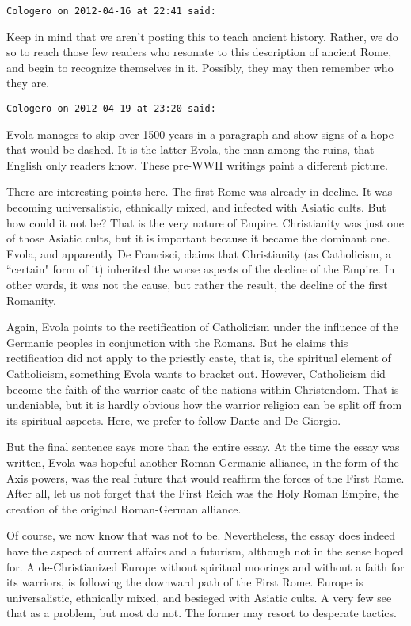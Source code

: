 \begin{footnotesize}\begin{sffamily}

\texttt{Cologero on 2012-04-16 at 22:41 said: }

Keep in mind that we aren't posting this to teach ancient history. Rather, we do so to reach those few readers who resonate to this description of ancient Rome, and begin to recognize themselves in it. Possibly, they may then remember who they are.


\hfill

\texttt{Cologero on 2012-04-19 at 23:20 said: }

Evola manages to skip over 1500 years in a paragraph and show signs of a hope that would be dashed. It is the latter Evola, the man among the ruins, that English only readers know. These pre-WWII writings paint a different picture.

There are interesting points here. The first Rome was already in decline. It was becoming universalistic, ethnically mixed, and infected with Asiatic cults. But how could it not be? That is the very nature of Empire. Christianity was just one of those Asiatic cults, but it is important because it became the dominant one. Evola, and apparently De Francisci, claims that Christianity (as Catholicism, a ``certain" form of it) inherited the worse aspects of the decline of the Empire. In other words, it was not the cause, but rather the result, the decline of the first Romanity.

Again, Evola points to the rectification of Catholicism under the influence of the Germanic peoples in conjunction with the Romans. But he claims this rectification did not apply to the priestly caste, that is, the spiritual element of Catholicism, something Evola wants to bracket out. However, Catholicism did become the faith of the warrior caste of the nations within Christendom. That is undeniable, but it is hardly obvious how the warrior religion can be split off from its spiritual aspects. Here, we prefer to follow Dante and De Giorgio.

But the final sentence says more than the entire essay. At the time the essay was written, Evola was hopeful another Roman-Germanic alliance, in the form of the Axis powers, was the real future that would reaffirm the forces of the First Rome. After all, let us not forget that the First Reich was the Holy Roman Empire, the creation of the original Roman-German alliance.

Of course, we now know that was not to be. Nevertheless, the essay does indeed have the aspect of current affairs and a futurism, although not in the sense hoped for. A de-Christianized Europe without spiritual moorings and without a faith for its warriors, is following the downward path of the First Rome. Europe is universalistic, ethnically mixed, and besieged with Asiatic cults. A very few see that as a problem, but most do not. The former may resort to desperate tactics.


\end{sffamily}
\end{footnotesize}
